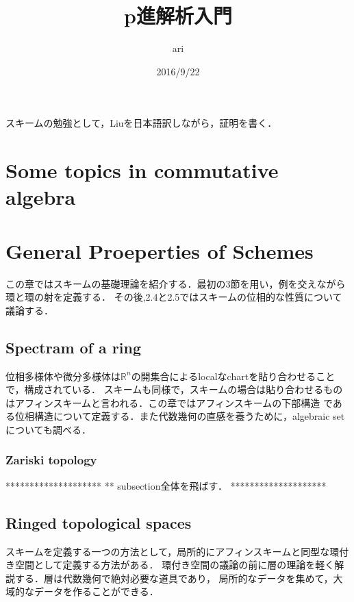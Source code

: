 \documentclass{ujarticle}
\title{p進解析入門}
\author{ari}
\date{2016/9/22}
\begin{document}
\maketitle
\tableofcontents


スキームの勉強として，Liuを日本語訳しながら，証明を書く．

\section{Some topics in commutative algebra}
\label{sec:Some topics in commutative algebra}

\section{General Proeperties of Schemes}
\label{sec:General Proeperties of Schemes}
この章ではスキームの基礎理論を紹介する．最初の3節を用い，例を交えながら環と環の射を定義する．
その後,2.4と2.5ではスキームの位相的な性質について議論する．

\subsection{Spectram of a ring}
\label{sub:Spectram of a ring}

位相多様体や微分多様体は$\mathbb{R}^n$の開集合によるlocalなchartを貼り合わせることで，構成されている．
スキームも同様で，スキームの場合は貼り合わせるものはアフィンスキームと言われる．この章ではアフィンスキームの下部構造
である位相構造について定義する．また代数幾何の直感を養うために，algebraic setについても調べる．

\subsubsection{Zariski topology}
\label{subs:Zariski topology}

********************
** subsection全体を飛ばす．
********************

\subsection{Ringed topological spaces}
\label{sub:Ringed topological spaces}
スキームを定義する一つの方法として，局所的にアフィンスキームと同型な環付き空間として定義する方法がある．
環付き空間の議論の前に層の理論を軽く解説する．層は代数幾何で絶対必要な道具であり，
局所的なデータを集めて，大域的なデータを作ることができる．
\end{document}
